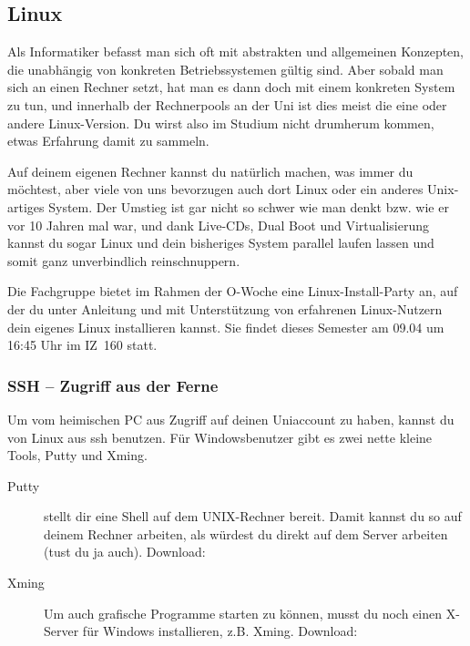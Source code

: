 

\subsection{Linux}
	\label{linux}
	Als Informatiker befasst man sich oft mit abstrakten und allgemeinen Konzepten, die unabhängig von konkreten Betriebssystemen gültig sind. Aber sobald man sich an einen Rechner setzt, hat man es dann doch mit einem konkreten System zu tun, und innerhalb der Rechnerpools an der Uni ist dies meist die eine oder andere Linux-Version. Du wirst also im Studium nicht drumherum kommen, etwas Erfahrung damit zu sammeln.

	Auf deinem eigenen Rechner kannst du natürlich machen, was immer du möchtest, aber viele von uns bevorzugen auch dort Linux oder ein anderes Unix-artiges System. Der Umstieg ist gar nicht so schwer wie man denkt bzw. wie er vor 10 Jahren mal war, und dank Live-CDs, Dual Boot und Virtualisierung kannst du sogar Linux und dein bisheriges System parallel laufen lassen und somit ganz unverbindlich reinschnuppern.

	Die Fachgruppe bietet im Rahmen der O-Woche eine Linux-Install-Party an, auf der du unter Anleitung und mit Unterstützung von erfahrenen Linux-Nutzern dein eigenes Linux installieren kannst. Sie findet dieses Semester am 09.04 um 16:45 Uhr im IZ~160 statt. 



	\subsubsection{SSH -- Zugriff aus der Ferne}
		Um vom heimischen PC aus Zugriff auf deinen Uniaccount zu haben, kannst du von Linux aus ssh benutzen. Für Windowsbenutzer gibt es zwei nette kleine Tools, Putty und Xming. %

		\begin{description}
			\item[Putty] stellt dir eine Shell auf dem UNIX-Rechner bereit. Damit kannst du so auf deinem Rechner arbeiten, als würdest du direkt auf dem Server arbeiten (tust du ja auch).  Download: 
			\item[Xming] Um auch grafische Programme starten zu können, musst du noch einen X-Server für Windows
			  installieren, z.B. Xming. Download: 
		\end{description}

